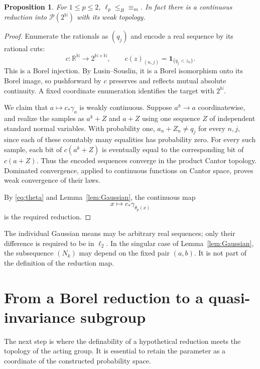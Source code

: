 \documentclass[11pt]{article}
\newtheorem{proposition}[theorem]{Proposition}
\theoremstyle{definition}
\newcommand{\N}{\mathbb N}
\newcommand{\R}{\mathbb R}
\newcommand{\Prob}{\mathcal P}
\newcommand{\ME}{\mathrel{\equiv_m}}
\newcommand{\leB}{\mathrel{\leq_B}}
\begin{document}
\begin{proposition}\label{prop:positive}
For $1\le p\le2$, $\ell_p\leB\ME$. In fact there is a continuous
reduction into $\Prob(2^\N)$ with its weak topology.
\end{proposition}
\begin{proof}
Enumerate the rationals as $(q_j)$ and encode a real sequence by its
rational cuts:
\[
 c:\R^\N\longrightarrow2^{\N\times\N},\qquad
 c(z)_{(n,j)}=\mathbf1_{\{q_j<z_n\}}.
\]
This is a Borel injection. By Lusin--Souslin, it is a Borel isomorphism
onto its Borel image, so pushforward by $c$ preserves and reflects mutual
absolute continuity. A fixed coordinate enumeration identifies the
target with $2^\N$.

We claim that $a\mapsto c_*\gamma_a$ is weakly continuous. Suppose
$a^k\to a$ coordinatewise, and realize the samples as $a^k+Z$ and $a+Z$
using one sequence $Z$ of independent standard normal variables.
With probability one, $a_n+Z_n\ne q_j$ for every $n,j$, since each of
these countably many equalities has probability zero. For every such
sample, each bit of $c(a^k+Z)$ is eventually equal to the corresponding
bit of $c(a+Z)$. Thus the encoded sequences converge in the product
Cantor topology. Dominated convergence, applied to continuous functions
on Cantor space, proves weak convergence of their laws.

By \eqref{eq:theta} and Lemma~\ref{lem:Gaussian}, the continuous map
\[
 x\longmapsto c_*\gamma_{\theta_p(x)}
\]
is the required reduction.
\end{proof}
The individual Gaussian means may be arbitrary real sequences; only
their difference is required to be in $\ell_2$. In the singular case of
Lemma~\ref{lem:Gaussian}, the subsequence $(N_k)$ may depend on the fixed
pair $(a,b)$. It is not part of the definition of the reduction map.

\section{From a Borel reduction to a quasi-invariance subgroup}
The next step is where the definability of a hypothetical reduction meets
the topology of the acting group. It is essential to retain the parameter
as a coordinate of the constructed probability space.
\end{document}
